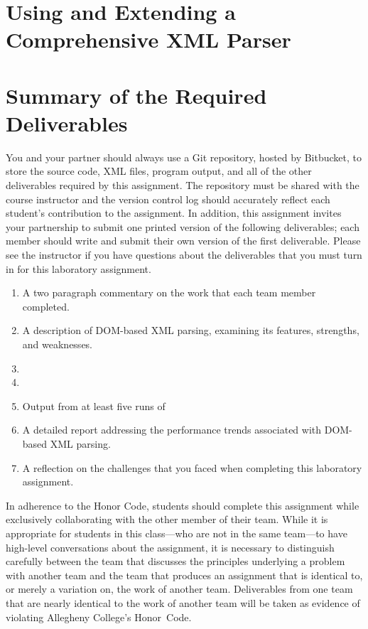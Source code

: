 \vspace*{-.05in}
\section*{Using and Extending a Comprehensive XML Parser}



\section*{Summary of the Required Deliverables}

You and your partner should always use a Git repository, hosted by Bitbucket, to store the source code, XML files,
program output, and all of the other deliverables required by this assignment. The repository must be shared with the
course instructor and the version control log should accurately reflect each student's contribution to the assignment.
In addition, this assignment invites your partnership to submit one printed version of the following deliverables; each
member should write and submit their own version of the first deliverable. Please see the instructor if you have
questions about the deliverables that you must turn in for this laboratory assignment.

\vspace*{-.05in}
\begin{enumerate}
  \setlength{\itemsep}{0pt}
  \item A two paragraph commentary on the work that each team member completed. 
  \item A description of DOM-based XML parsing, examining its features, strengths, and weaknesses.
  \item 
  \item 
  \item Output from at least five runs of 
  \item A detailed report addressing the performance trends associated with DOM-based XML parsing.
  \item A reflection on the challenges that you faced when completing this laboratory assignment.
\end{enumerate}
\vspace*{-.05in}

In adherence to the Honor Code, students should complete this assignment while exclusively collaborating with the
other member of their team. While it is appropriate for students in this class---who are not in the same team---to have
high-level conversations about the assignment, it is necessary to distinguish carefully between the team that discusses
the principles underlying a problem with another team and the team that produces an assignment that is identical to, or
merely a variation on, the work of another team.  Deliverables from one team that are nearly identical to the work of
another team will be taken as evidence of violating Allegheny College's \mbox{Honor Code}.



